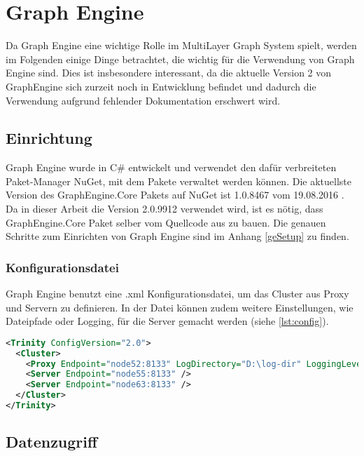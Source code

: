 \section{Graph Engine}

Da Graph Engine eine wichtige Rolle im MultiLayer Graph System spielt, werden im Folgenden einige Dinge betrachtet, die wichtig für die Verwendung von Graph Engine sind.
Dies ist insbesondere interessant, da die aktuelle Version 2 von GraphEngine sich zurzeit noch in Entwicklung befindet und dadurch die Verwendung aufgrund fehlender Dokumentation erschwert wird.


\subsection{Einrichtung}

Graph Engine wurde in C\# entwickelt und verwendet den dafür verbreiteten Paket-Manager NuGet, mit dem Pakete verwaltet werden können.
Die aktuellste Version des GraphEngine.Core Pakets auf NuGet ist 1.0.8467 vom 	19.08.2016 \cite{geVersion}. Da in dieser Arbeit die Version 2.0.9912 verwendet wird, ist es nötig, dass GraphEngine.Core Paket selber vom Quellcode aus zu bauen.
Die genauen Schritte zum Einrichten von Graph Engine sind im Anhang \ref{geSetup} zu finden.


\subsubsection{Konfigurationsdatei}

Graph Engine benutzt eine .xml Konfigurationsdatei, um das Cluster aus Proxy und Servern zu definieren.
In der Datei können zudem weitere Einstellungen, wie Dateipfade oder Logging, für die Server gemacht werden (siehe \ref{lst:config}).

\begin{lstlisting}[language=xml, label={lst:config}, caption={Beispiel Konfigurationsdatei für ein Cluster mit einer Proxy und zwei Servern}]
<Trinity ConfigVersion="2.0">
  <Cluster>
    <Proxy Endpoint="node52:8133" LogDirectory="D:\log-dir" LoggingLevel="Info" />  
    <Server Endpoint="node55:8133" />
    <Server Endpoint="node63:8133" />
  </Cluster>
</Trinity>
\end{lstlisting}


\subsection{Datenzugriff}
\label{datenzugriff}

